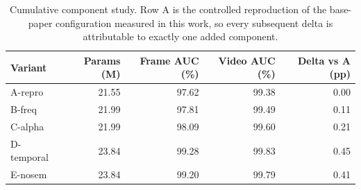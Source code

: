 \begin{table}[!t]
\centering
\caption{Cumulative component study. Row A is the controlled reproduction of the base-paper configuration measured in this work, so every subsequent delta is attributable to exactly one added component.}
\label{tab:tableVII_component_ablation}
\footnotesize
\begin{tabular}{lrrrr}
\hline\hline
Variant & Params (M) & Frame AUC (\%) & Video AUC (\%) & Delta vs A (pp) \\
\hline
A-repro & 21.55 & 97.62 & 99.38 & 0.00 \\
B-freq & 21.99 & 97.81 & 99.49 & 0.11 \\
C-alpha & 21.99 & 98.09 & 99.60 & 0.21 \\
D-temporal & 23.84 & 99.28 & 99.83 & 0.45 \\
E-nosem & 23.84 & 99.20 & 99.79 & 0.41 \\
\hline\hline
\end{tabular}
\end{table}
